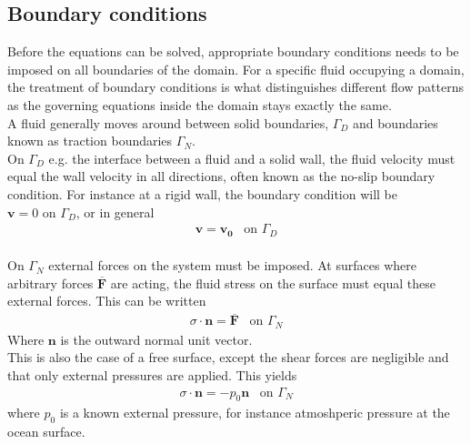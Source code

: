 \subsection{Boundary conditions}
Before the equations can be solved, appropriate boundary conditions needs to be imposed on all boundaries of the domain. For a specific fluid occupying a domain, the treatment of boundary conditions is what distinguishes different flow patterns as the governing equations inside the domain stays exactly the same. 
\\
A fluid generally moves around between solid boundaries, $\Gamma_D$ and boundaries known as traction boundaries $\Gamma_N$.
\\
On $\Gamma_D$ e.g. the interface between a fluid and a solid wall, the fluid velocity must equal the wall velocity in all directions, often known as the no-slip boundary condition. For instance at a rigid wall, the boundary condition will be $\mathbf{v} = 0 \text{ on } \Gamma_D$, or in general 
\begin{align}
\mathbf{v} = \mathbf{v_0} \,\,\, \text{ on } \Gamma_D
\end{align}
\\
On $\Gamma_N$ external forces on the system must be imposed. At surfaces where arbitrary forces $\mathbf{\overline{F}}$ are acting, the fluid stress on the surface must equal these external forces. This can be written
\begin{align}
\sigma \cdot \mathbf{n} = \mathbf{\overline{F}}\,\,\, \text{ on } \Gamma_N
\end{align}
Where $\mathbf{n}$ is the outward normal unit vector. 
\\
This is also the case of a free surface, except the shear forces are negligible and that only external pressures are applied. This yields
\begin{align}
\sigma \cdot \mathbf{n} = -p_0 \mathbf{n} \,\,\, \text{ on } \Gamma_N
\end{align}
where $p_0$ is a known external pressure, for instance atmoshperic pressure at the ocean 
surface. 
